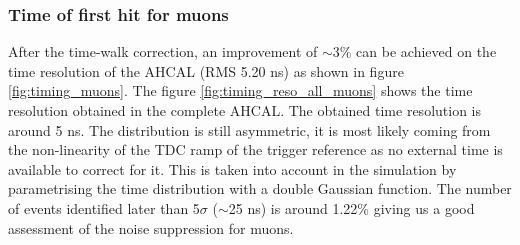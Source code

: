 \subsubsection{Time of first hit for muons}
\label{subsec:Muon_final}

After the time-walk correction, an improvement of $\sim$3\% can be achieved on the time resolution of the AHCAL (RMS 5.20 ns) as shown in figure \ref{fig:timing_muons}. The figure \ref{fig:timing_reso_all_muons} shows the time resolution obtained in the complete AHCAL. The obtained time resolution is around 5 ns. The distribution is still asymmetric, it is most likely coming from the non-linearity of the TDC ramp of the trigger reference as no external time is available to correct for it. This is taken into account in the simulation by parametrising the time distribution with a double Gaussian function. The number of events identified later than 5$\sigma$ ($\sim$25 ns) is around 1.22\% giving us a good assessment of the noise suppression for muons.

